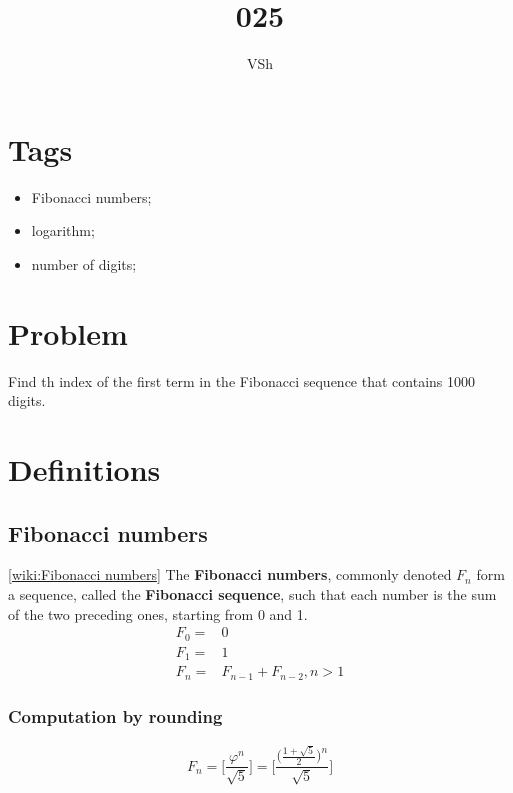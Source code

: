 \documentclass{article}
\begin{document}
\title{025}
\author{VSh}

\maketitle

\section{Tags}
\begin{itemize}
    \item Fibonacci numbers;
    \item logarithm;
    \item number of digits;
\end{itemize}

\section{Problem}
Find th index of the first term in the Fibonacci sequence that contains 1000 digits.
\newline
[\href{https://projecteuler.net/problem=25}{problem}]

\section{Definitions}
\subsection{Fibonacci numbers}
[\href{https://en.wikipedia.org/wiki/Fibonacci_number}{wiki:Fibonacci numbers}] \newline
The \textbf{Fibonacci numbers}, commonly denoted $F_n$ form a sequence, called 
the \textbf{Fibonacci sequence}, such that each number is the sum of the two 
preceding ones, starting from 0 and 1.
\begin{align*}
    F_0 = & 0 \\
    F_1 = & 1 \\
    F_n = & F_{n-1} + F_{n-2}, n > 1
\end{align*}

\subsubsection{Computation by rounding}
\begin{equation*}
    F_n = \bigg[  \frac{\varphi^{n}}{\sqrt{5}}  \bigg] 
    = \bigg[  \frac{\big( \frac{1 + \sqrt{5}}{2} \big)^{n}}{\sqrt{5}}  \bigg]
\end{equation*}
\end{document}
